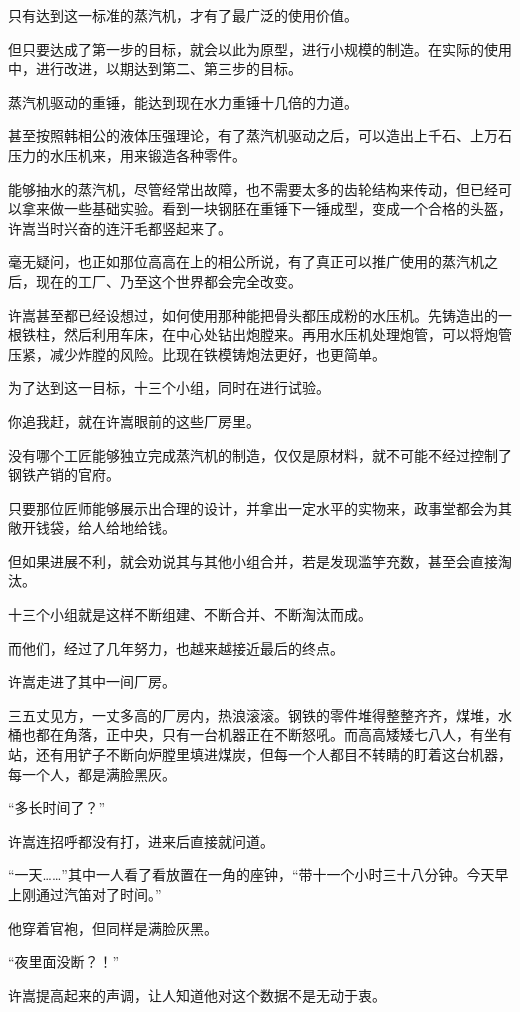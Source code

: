 只有达到这一标准的蒸汽机，才有了最广泛的使用价值。

但只要达成了第一步的目标，就会以此为原型，进行小规模的制造。在实际的使用中，进行改进，以期达到第二、第三步的目标。

蒸汽机驱动的重锤，能达到现在水力重锤十几倍的力道。

甚至按照韩相公的液体压强理论，有了蒸汽机驱动之后，可以造出上千石、上万石压力的水压机来，用来锻造各种零件。

能够抽水的蒸汽机，尽管经常出故障，也不需要太多的齿轮结构来传动，但已经可以拿来做一些基础实验。看到一块钢胚在重锤下一锤成型，变成一个合格的头盔，许嵩当时兴奋的连汗毛都竖起来了。

毫无疑问，也正如那位高高在上的相公所说，有了真正可以推广使用的蒸汽机之后，现在的工厂、乃至这个世界都会完全改变。

许嵩甚至都已经设想过，如何使用那种能把骨头都压成粉的水压机。先铸造出的一根铁柱，然后利用车床，在中心处钻出炮膛来。再用水压机处理炮管，可以将炮管压紧，减少炸膛的风险。比现在铁模铸炮法更好，也更简单。

为了达到这一目标，十三个小组，同时在进行试验。

你追我赶，就在许嵩眼前的这些厂房里。

没有哪个工匠能够独立完成蒸汽机的制造，仅仅是原材料，就不可能不经过控制了钢铁产销的官府。

只要那位匠师能够展示出合理的设计，并拿出一定水平的实物来，政事堂都会为其敞开钱袋，给人给地给钱。

但如果进展不利，就会劝说其与其他小组合并，若是发现滥竽充数，甚至会直接淘汰。

十三个小组就是这样不断组建、不断合并、不断淘汰而成。

而他们，经过了几年努力，也越来越接近最后的终点。

许嵩走进了其中一间厂房。

三五丈见方，一丈多高的厂房内，热浪滚滚。钢铁的零件堆得整整齐齐，煤堆，水桶也都在角落，正中央，只有一台机器正在不断怒吼。而高高矮矮七八人，有坐有站，还有用铲子不断向炉膛里填进煤炭，但每一个人都目不转睛的盯着这台机器，每一个人，都是满脸黑灰。

“多长时间了？”

许嵩连招呼都没有打，进来后直接就问道。

“一天……”其中一人看了看放置在一角的座钟，“带十一个小时三十八分钟。今天早上刚通过汽笛对了时间。”

他穿着官袍，但同样是满脸灰黑。

“夜里面没断？！”

许嵩提高起来的声调，让人知道他对这个数据不是无动于衷。


